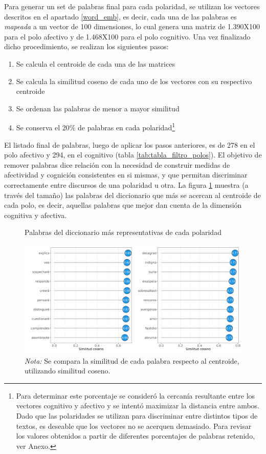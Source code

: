 \documentclass[
  12pt,
]{article}
\providecommand{\tightlist}{%
  \setlength{\itemsep}{0pt}\setlength{\parskip}{0pt}}
\begin{document}
Para generar un set de palabras final para cada polaridad, se utilizan
los vectores descritos en el apartado \ref{word_emb}, es decir, cada una
de las palabras es \emph{mapeada} a un vector de 100 dimensiones, lo
cual genera una matriz de 1.390X100 para el polo afectivo y de 1.468X100
para el polo cognitivo. Una vez finalizado dicho procedimiento, se
realizan los siguientes pasos:

\begin{enumerate}
\def\labelenumi{\arabic{enumi}.}
\tightlist
\item
  Se calcula el centroide de cada una de las matrices
\item
  Se calcula la similitud coseno de cada uno de los vectores con su
  respectivo centroide
\item
  Se ordenan las palabras de menor a mayor similitud
\item
  Se conserva el 20\% de palabras en cada
  polaridad\footnote{Para determinar este porcentaje se consideró la cercanía resultante entre los vectores cognitivo y afectivo y se intentó maximizar la distancia entre ambos. Dado que las polaridades se utilizan para discriminar entre distintos tipos de textos, es deseable que los vectores no se acerquen demasiado. Para revisar los valores obtenidos a partir de diferentes porcentajes de palabras retenido, ver Anexo.}
\end{enumerate}

El listado final de palabras, luego de aplicar los pasos anteriores, es
de 278 en el polo afectivo y 294, en el cognitivo (tabla
\ref{tab:tabla_filtro_polos}). El objetivo de remover palabras dice
relación con la necesidad de construir medidas de afectividad y
cognición consistentes en si mismas, y que permitan discriminar
correctamente entre discursos de una polaridad u otra. La figura
\ref{wordcload} muestra (a través del tamaño) las palabras del
diccionario que más se acercan al centroide de cada polo, es decir,
aquellas palabras que mejor dan cuenta de la dimensión cognitiva y
afectiva.

\begin{figure}[H]
\centering
\large
\caption{Palabras del diccionario más representativas de cada polaridad}
\label{wordcload}
\includegraphics[width = 0.8 \textwidth]{cuadros_tesis/plot_important_words.png}
 \caption*{\footnotesize{\textit{Nota:} Se compara la similitud de cada palabra respecto al centroide, utilizando similitud coseno.}}
\end{figure}
\end{document}
